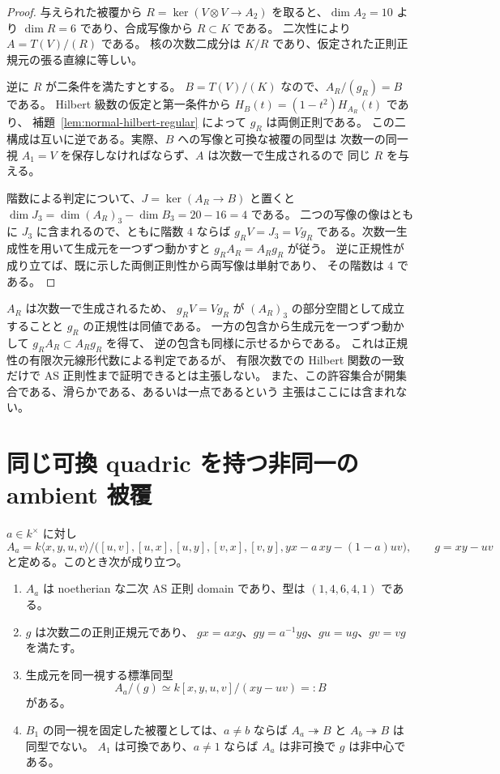 \begin{proof}
与えられた被覆から
$R=\ker(V\otimes V\to A_2)$ を取ると、$\dim A_2=10$ より
$\dim R=6$ であり、合成写像から $R\subset K$ である。
二次性により $A=T(V)/(R)$ である。
核の次数二成分は $K/R$ であり、仮定された正則正規元の張る直線に等しい。

逆に $R$ が二条件を満たすとする。
$B=T(V)/(K)$ なので、$A_R/(g_R)=B$ である。
Hilbert 級数の仮定と第一条件から
$H_B(t)=(1-t^2)H_{A_R}(t)$ であり、
補題~\ref{lem:normal-hilbert-regular} によって $g_R$ は両側正則である。
この二構成は互いに逆である。実際、$B$ への写像と可換な被覆の同型は
次数一の同一視 $A_1=V$ を保存しなければならず、$A$ は次数一で生成されるので
同じ $R$ を与える。

階数による判定について、$J=\ker(A_R\to B)$ と置くと
$\dim J_3=\dim(A_R)_3-\dim B_3=20-16=4$ である。
二つの写像の像はともに $J_3$ に含まれるので、ともに階数 $4$ ならば
$g_RV=J_3=Vg_R$ である。次数一生成性を用いて生成元を一つずつ動かすと
$g_RA_R=A_Rg_R$ が従う。
逆に正規性が成り立てば、既に示した両側正則性から両写像は単射であり、
その階数は $4$ である。
\end{proof}

\begin{remark}[有限次数の判定と未解決部分]
$A_R$ は次数一で生成されるため、
$g_RV=Vg_R$ が $(A_R)_3$ の部分空間として成立することと
$g_R$ の正規性は同値である。
一方の包含から生成元を一つずつ動かして $g_RA_R\subset A_Rg_R$ を得て、
逆の包含も同様に示せるからである。
これは正規性の有限次元線形代数による判定であるが、
有限次数での Hilbert 関数の一致だけで AS 正則性まで証明できるとは主張しない。
また、この許容集合が開集合である、滑らかである、あるいは一点であるという
主張はここには含まれない。
\end{remark}

\section{同じ可換 quadric を持つ非同一の ambient 被覆}
\label{sec:ore-ambient-family}

\begin{proposition}[正規被覆を忘れる写像の非自明なファイバー]
\label{prop:ore-ambient-family}
$a\in k^{\times}$ に対し
\[
 A_a=k\langle x,y,u,v\rangle/
 \bigl([u,v],[u,x],[u,y],[v,x],[v,y],
       yx-a\,xy-(1-a)uv\bigr),\qquad g=xy-uv
\]
と定める。このとき次が成り立つ。
\begin{enumerate}
 \item $A_a$ は noetherian な二次 AS 正則 domain であり、型は
       $(1,4,6,4,1)$ である。
 \item $g$ は次数二の正則正規元であり、
       $gx=a xg$、$gy=a^{-1}yg$、$gu=ug$、$gv=vg$ を満たす。
 \item 生成元を同一視する標準同型
       \[
        A_a/(g)\simeq k[x,y,u,v]/(xy-uv)=:B
       \]
       がある。
 \item $B_1$ の同一視を固定した被覆としては、$a\ne b$ ならば
       $A_a\twoheadrightarrow B$ と $A_b\twoheadrightarrow B$ は同型でない。
       $A_1$ は可換であり、$a\ne1$ ならば $A_a$ は非可換で $g$ は非中心である。
\end{enumerate}
\end{proposition}

